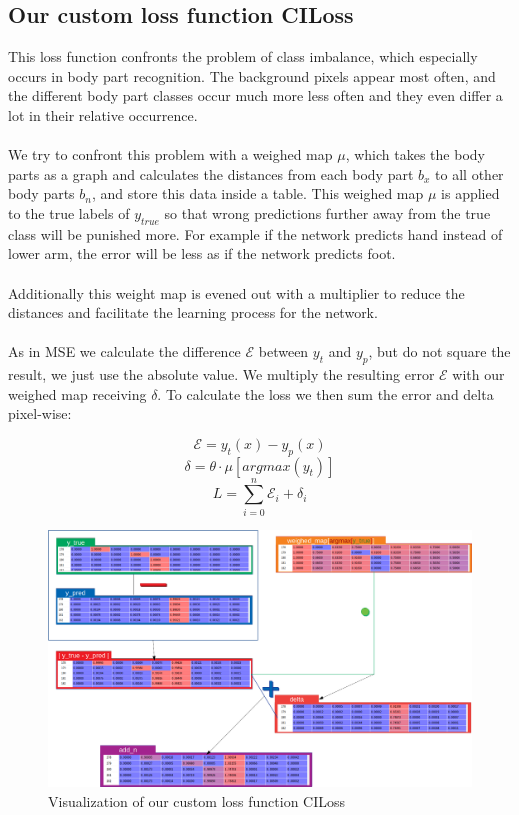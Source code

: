 \subsection{Our custom loss function CILoss}
\label{ciloss}
This loss function confronts the problem of class imbalance, which especially occurs in body part recognition.
The background pixels appear most often, and the different body part classes occur much more less often and they even
differ a lot in their relative occurrence.
\\\mbox{}\\
We try to confront this problem with a weighed map $\mu$, which takes the body parts as a graph and calculates
the distances from each body part $b_x$ to all other body parts $b_n$, and store this data inside a table.
This weighed map $\mu$ is applied to the true labels of $y_{true}$ so that wrong predictions further away from the true
class will be punished more. For example if the network predicts hand instead of lower arm, the error will be less as if
the network predicts foot.
\\\mbox{}\\
Additionally this weight map is evened out with a multiplier to reduce the distances and facilitate
the learning process for the network.
\\\mbox{}\\
As in MSE we calculate the difference $\mathcal{E}$ between $y_t$ and $y_p$, but do not square the result, we just use the absolute value.
We multiply the resulting error $\mathcal{E}$ with our weighed map receiving $\delta$.
To calculate the loss we then sum the error and delta pixel-wise:

$$\mathcal{E}=y_t(x)-y_p(x)$$
$$\delta=\theta\cdot\mu[argmax(y_t)] $$
$$L=\sum_{i=0}^{n}\mathcal{E}_i+\delta_i$$


\begin{figure}[H]
    \centering
    \includegraphics[width=\textwidth,height=\textheight,keepaspectratio]{img/loss_calculation.png}
    \decoRule
    \caption[CILoss]{Visualization of our custom loss function CILoss}
    \label{fig:ciloss-calc}
\end{figure}
